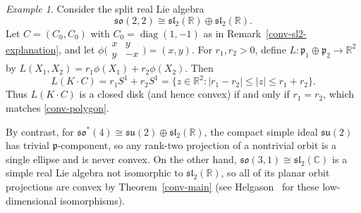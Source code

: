 \documentclass[11pt,reqno]{amsart}
\theoremstyle{remark}
\newtheorem{example}[theorem]{Example}
\newcommand{\R}{\mathbb R}
\newcommand{\C}{\mathbb C}
\newcommand{\pfr}{\mathfrak p}
\begin{document}
\begin{example}\label{conv-so22}
Consider the split real Lie algebra
\[
 \mathfrak{so}(2,2)\cong
 \mathfrak{sl}_2(\R)\oplus\mathfrak{sl}_2(\R).
\]
Let $C=(C_0,C_0)$ with $C_0=\operatorname{diag}(1,-1)$ as in
Remark~\ref{conv-sl2-explanation}, and let
$\phi\bigl(\begin{smallmatrix}x&y\\y&-x\end{smallmatrix}\bigr)=(x,y)$.
For $r_1,r_2>0$, define $L:\pfr_1\oplus\pfr_2\to\R^2$ by
$L(X_1,X_2)=r_1\phi(X_1)+r_2\phi(X_2)$. Then
\[
 L(K\cdot C)=r_1S^1+r_2S^1
 =\{z\in\R^2:|r_1-r_2|\le|z|\le r_1+r_2\}.
\]
Thus $L(K\cdot C)$ is a closed disk (and hence convex) if and only if
$r_1=r_2$, which matches \eqref{conv-polygon}.

By contrast, for
$\mathfrak{so}^*(4)\cong\mathfrak{su}(2)\oplus\mathfrak{sl}_2(\R)$,
the compact simple ideal $\mathfrak{su}(2)$ has trivial $\pfr$-component,
so any rank-two projection of a nontrivial orbit is a single ellipse and is never convex. On the other hand,
$\mathfrak{so}(3,1)\cong\mathfrak{sl}_2(\C)$ is a simple real Lie
algebra not isomorphic to $\mathfrak{sl}_2(\R)$, so all of its planar
orbit projections are convex by Theorem~\ref{conv-main} (see
Helgason~\cite[Chapter~X, Section~6, pages~518--520]{Helgason1978} for
these low-dimensional isomorphisms).
\end{example}
\end{document}

